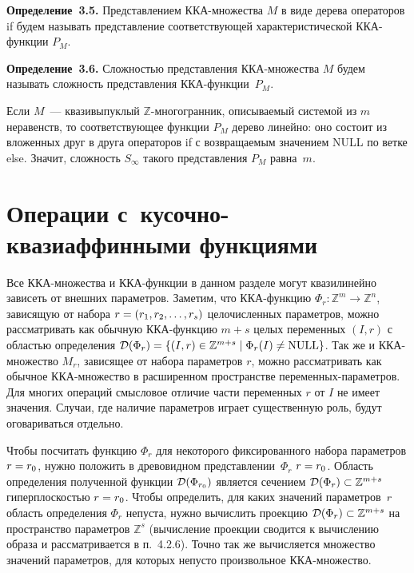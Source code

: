 \begin{multicols}{2}
\smallskip

\noindent
\textbf{Определение~3.5.}
Представлением ККА-мно\-жест\-ва $M$ в виде дерева операторов if
будем называть представление соответствующей характеристической
ККА-функции $P_M$.

\smallskip

\noindent
\textbf{Определение~3.6.}
Сложностью пред\-став\-ле\-ния ККА-мно\-же\-ст\-ва $M$ будем называть слож\-ность пред\-став\-ле\-ния 
ККА-функ\-ции~$P_M$.

\smallskip

Если $M$~---  квазивыпуклый $\mathbb{Z}$-мно\-го\-гран\-ник, описываемый
системой из $m$ неравенств, то соответствующее функции $P_M$ дерево
линейно: оно состоит из вложенных друг в друга операторов if с
возвращаемым значением NULL по ветке else. Значит, сложность
$S_\infty$ такого представления $P_M$ равна~$m$.


\section{Операции с~кусочно-квазиаффинными функциями}

Все ККА-множества и ККА-функции в данном разделе могут квазилинейно
зависеть от внешних параметров. Заметим, что ККА-функцию
$\Phi_r:\mathbb{Z}^m\to\mathbb{Z}^n$, зависящую от набора
$r\hm=(r_1,r_2,\ldots,r_s)$ целочисленных параметров, можно
рассматривать как обычную ККА-функ\-цию $m+s$ целых переменных
$(I,r)$ с областью определения ${\cal D}(\Phi_r)\hm=\{ (I,r)\hm\in
\mathbb{Z}^{m+s} \mid \Phi_r(I)\hm\neq \mathrm{NULL} \}$. Так же и
ККА-множество $M_r$, зависящее от набора параметров $r$, можно
рассматривать как обычное ККА-мно\-же\-ст\-во в расширенном пространстве
пе\-ре\-мен\-ных-па\-ра\-мет\-ров. Для многих операций смысловое отличие
части переменных $r$ от $I$ не имеет значения. Случаи, где наличие
параметров играет существенную роль, будут оговариваться отдельно.

Чтобы посчитать функцию $\Phi_r$ для некоторого фиксированного
набора параметров $r\hm=r_0$, нужно положить в древовидном
представлении~$\Phi_r$ $r\hm=r_0$. Область определения полученной
функции ${\cal D}(\Phi_{r_0})$ является сечением ${\cal
D}(\Phi_r)\subset \mathbb{Z}^{m+s}$ гиперплоскостью $r\hm=r_0$. Чтобы
определить, для каких значений параметров~$r$ область определения
$\Phi_r$ непуста, нужно вычислить проекцию ${\cal D}(\Phi_r)\subset
\mathbb{Z}^{m+s}$ на пространство параметров $\mathbb{Z}^s$
(вычисление проекции сводится к вычислению образа и рассматривается
в п.~4.2.6). Точно так же вычисляется множество значений
параметров, для которых непусто произвольное ККА-мно\-же\-ство.


\end{multicols}

